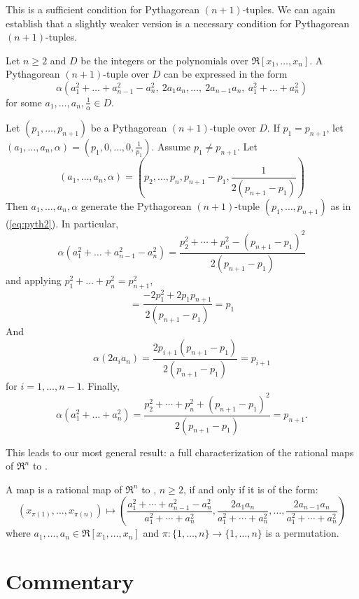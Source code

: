 This is a sufficient condition for Pythagorean $(n+1)$-tuples.
We can again establish that a slightly weaker version is a necessary condition
for Pythagorean $(n+1)$-tuples.

\begin{theorem}
\label{thm:necessaryn}
Let $n \geq 2$ and $D$ be the integers or the polynomials 
over $\Re[x_1,\ldots,x_n]$.
A Pythagorean $(n+1)$-tuple over $D$ can be expressed in the form
\begin{equation}
\label{eq:pyth2}
	\alpha (a_1^2 + \ldots + a_{n-1}^2 - a_n^2,
		\ 2a_1a_n,\ldots,\ 2a_{n-1}a_n,
		\ a_1^2 + \ldots + a_n^2)
\end{equation}
for some $a_1,\ldots,a_n,\frac{1}{\alpha} \in D$.
\end{theorem}
\prf
Let $(p_1,\ldots,p_{n+1})$ be a Pythagorean $(n+1)$-tuple over $D$.
If $p_1 = p_{n+1}$, let 
$(a_1,\ldots,a_n,\alpha) = (p_1,0,\ldots,0,\frac{1}{p_1})$.
Assume $p_1 \neq p_{n+1}$.
Let 
\[
(a_1,\ldots,a_n,\alpha) = (p_2,\ldots,p_n,p_{n+1}-p_1,
	\frac{1}{2(p_{n+1}-p_1)})
\]
Then $a_1,\ldots,a_n,\alpha$ generate the Pythagorean $(n+1)$-tuple
$(p_1,\ldots,p_{n+1})$ as in (\ref{eq:pyth2}).
In particular,
\[
\alpha (a_1^2 + \ldots + a_{n-1}^2 - a_n^2)
= \frac{p_2^2 + \cdots + p_n^2 - (p_{n+1}-p_1)^2}{2(p_{n+1}-p_1)}
\]
and applying $p_1^2 + \ldots + p_n^2 = p_{n+1}^2$,
\[
= \frac{-2p_1^2 + 2p_1p_{n+1}}{2(p_{n+1} - p_1)}
= p_1
\]
And
\[
\alpha (2a_i a_n) 
= \frac{2p_{i+1}(p_{n+1}-p_1)}{2(p_{n+1}-p_1)}
= p_{i+1}
\]
for $i=1,\ldots,n-1$.
Finally, 
\[ 
\alpha (a_1^2 + \ldots + a_n^2)
= \frac{p_2^2 + \cdots + p_n^2 + (p_{n+1}-p_1)^2}{2(p_{n+1}-p_1)}
= p_{n+1}.
\]
\QED

This leads to our most general result: 
a full characterization of the rational maps of $\Re^n$ to .

\begin{theorem}
\label{thm:nn}
A map is a rational map of $\Re^n$ to , $n \geq 2$, if and only if
it is of the form:
\[
	(x_{\pi(1)},\ldots,x_{\pi(n)}) \mapsto 
	(\frac{a_1^2 + \cdots + a_{n-1}^2 - a_n^2}{a_1^2 + \cdots + a_n^2},
	 \frac{2a_1a_n}{a_1^2 + \cdots + a_n^2},
	 \ldots,
	 \frac{2a_{n-1}a_n}{a_1^2 + \cdots + a_n^2})
\]
where $a_1,\ldots,a_n \in \Re[x_1,\ldots,x_n]$
and $\pi: \{1,\ldots,n\} \rightarrow \{1,\ldots,n\}$ is a permutation.
\end{theorem}

\section{Commentary}
\label{sec:commentary}

